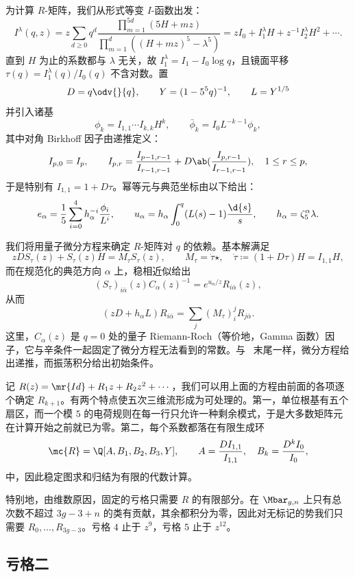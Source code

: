 为计算 \(R\)-矩阵，我们从形式等变 \(I\)-函数出发：
\[ I^{\lambda}(q,z) = z\sum_{d\geq0}q^d \frac{\prod_{m=1}^{5d}(5H+mz)}{\prod_{m=1}^d ((H+mz)^5 - \lambda^5)} = zI_0 + I_1^{\lambda}H + z^{-1}I_2^{\lambda}H^2 + \cdots. \]
直到 \(H\) 为止的系数都与 \(\lambda\) 无关，故 \(I_1^{\lambda} = I_1 - I_0 \log q\)，且镜面平移 \(\tau(q) = I_1^{\lambda}(q)/I_0(q)\) 不含对数。置
\[ D = q\odv{}{q}, \qquad Y = (1-5^5q)^{-1}, \qquad L = Y^{1/5} \]
并引入诸基
\[ \phi_k = I_{1,1}\cdots I_{k,k}H^k, \qquad \bar{\phi}_k = I_0 L^{-k-1}\phi_k, \]
其中对角 Birkhoff 因子由递推定义：
\[ I_{p,0} = I_p, \qquad I_{p,r} = \frac{I_{p-1,r-1}}{I_{r-1,r-1}} + D \ab( \frac{I_{p,r-1}}{I_{r-1,r-1}}), \quad 1 \leq r \leq p, \]
于是特别有 \(I_{1,1} = 1+D\tau\)。幂等元与典范坐标由以下给出：
\[ e_{\alpha} = \frac{1}{5}\sum_{i=0}^4 h_{\alpha}^{-i}\frac{\phi_i}{L^i}, \qquad u_{\alpha} = h_{\alpha}\int_0^q (L(s)-1)\frac{\d{s}}{s}, \qquad h_{\alpha} = \zeta_5^{\alpha}\lambda. \]

我们将用量子微分方程来确定 \(R\)-矩阵对 \(q\) 的依赖。基本解满足
\[ zDS_{\tau}(z) + S_{\tau}(z)H = M_{\tau}S_{\tau}(z), \qquad M_{\tau} = \dot{\tau}\star, \quad \dot{\tau} \coloneqq (1+D\tau)H = I_{1,1}H, \]
而在规范化的典范方向 \(\alpha\) 上，稳相近似给出
\[ (S_{\tau})_{i\bar{\alpha}}(z)C_{\alpha}(z)^{-1} = e^{u_{\alpha}/z}R_{i\bar{\alpha}}(z), \]
从而
\[ (zD+h_{\alpha}L)R_{i\bar{\alpha}} = \sum_j (M_{\tau})_i^j R_{j\bar{\alpha}}. \]
这里，\(C_{\alpha}(z)\) 是 \(q=0\) 处的量子 Riemann-Roch（等价地，Gamma 函数）因子，它与辛条件一起固定了微分方程无法看到的常数。与~ 末尾一样，微分方程给出递推，而振荡积分给出初始条件。

记 \(R(z) = \mr{Id} + R_1 z + R_2 z^2 + \cdots\)，我们可以用上面的方程由前面的各项逐个确定 \(R_{k+1}\)。有两个特点使五次三维流形成为可处理的。第一，单位根基有五个扇区，而一个模 \(5\) 的电荷规则在每一行只允许一种剩余模式，于是大多数矩阵元在计算开始之前就已为零。第二，每个系数都落在有限生成环
\[ \mc{R} = \Q[A,B_1,B_2,B_3,Y], \qquad A = \frac{DI_{1,1}}{I_{1,1}}, \quad B_k = \frac{D^k I_0}{I_0}, \]
中，因此稳定图求和归结为有限的代数计算。

\begin{rmk}
    特别地，由维数原因，固定的亏格只需要 \(R\) 的有限部分。在 \(\Mbar_{g,n}\) 上只有总次数不超过 \(3g-3+n\) 的类有贡献，其余都积分为零，因此对无标记的势我们只需要 \(R_0, \ldots, R_{3g-3}\)。亏格 \(4\) 止于 \(z^9\)，亏格 \(5\) 止于 \(z^{12}\)。
\end{rmk}

\subsection{亏格二}%
\label{sub:Genus two}


